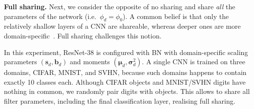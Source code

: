 \documentclass[10pt,twocolumn,letterpaper]{article}
\renewcommand{\paragraph}[1]{\par\medskip\noindent\textbf{#1}}
\begin{document}
\begin{table*}
\centering
{}
  \caption{Top-1 error rate(\%) for various tasks. The table shows the results in case of no feature sharing between different domains (first row), deep feature sharing of all convolutional weights (deep), partial sharing for selected convolutional weights in block 1-3 and block 2-4 and deep sharing with more convolutional filters ($\times2$ and $4\times$ number of filters). }
 \label{tab:multismall}

\end{table*}

 
\paragraph{Full sharing.} Next, we consider the opposite of no sharing and share \emph{all} the parameters of the network (i.e.\ $\phi_d = \phi_0$). A common belief is that only the relatively shallow layers of a CNN are shareable, whereas deeper ones are more domain-specific~\cite{lenc15understanding}. Full sharing challenges this notion.

In this experiment, ResNet-38 is configured with BN with domain-specific scaling parameters $(\bm s_d, \bm b_d)$ and moments $(\bm \mu_d,\bm\sigma_d^2)$.  A single CNN is trained on three domains, CIFAR, MNIST, and SVHN, because such domains happens to contain exactly 10 classes each. Although CIFAR objects and MNIST/SVHN digits have nothing in common, we randomly pair digits with objects. This allows to share  all filter parameters, including the final classification layer, realising full sharing. 
\end{document}
